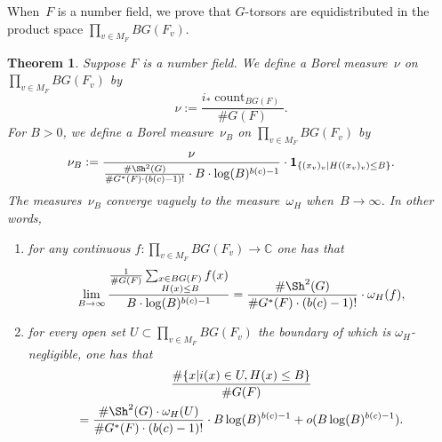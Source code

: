 \documentclass[a4paper,english,12pt]{amsart}
\newcommand{\CC}{\mathbb{C}}
\newcommand{\vMF}{v\in M_F}
\DeclareMathOperator{\coun}{count}
\newtheorem{thm}[equation]{Theorem}
\numberwithin{equation}{subsection}
\begin{document}
When~$F$ is a number field, we prove that $G$-torsors are equidistributed in the product space $\prod_{\vMF}BG(F_v)$.
\begin{thm}%
\label{thmofequidistribution} Suppose $F$ is a number field. We define a Borel measure~$\nu$ on $\prod_{\vMF}BG(F_v)$ by $$\nu:=\frac{i_*\coun_{BG(F)}}{\#G(F)}.$$
 For $B>0$, we define a Borel measure~$\nu_B$ on $\prod_{\vMF}BG(F_v)$ by $$\nu_B:=\frac{\nu}{\frac{\#\Sh^2(G)}{\# G^*(F)\cdot (b(c)-1)!}\cdot B\cdot \log(B)^{b(c)-1}}\cdot\mathbf 1_{\{(x_v)_v|H((x_v)_v)\leq B\}}.$$ The measures~$\nu_B$ converge vaguely to the measure~$\omega_H$ when~$B\to\infty$. In other words,
\begin{enumerate}
\item for any continuous $f:\prod_{\vMF}BG(F_v)\to\CC$ one has that $$\lim_{B\to\infty}\frac{\frac{1}{\# G(F)}\sum_{\substack{x\in BG(F)\\H(x)\leq B}}f(x)}{B\cdot\log(B)^{b(c)-1}}=\frac{\#\Sh^2(G)}{\# G^*(F)\cdot (b(c)-1)!}\cdot \omega_H(f),$$
\item for every open set $U\subset\prod_{\vMF}BG(F_v)$ the boundary of which is $\omega_H$-negligible, one has that \begin{multline*}\frac{\#\{x|i(x)\in U, H(x)\leq B\}}{\# G(F)}\\=\frac{\#\Sh^2(G)\cdot\omega_H(U)}{\# G^*(F)\cdot (b(c)-1)!}\cdot {B\log(B)^{b(c)-1}}+o(B\log(B)^{b(c)-1}).
\end{multline*}
\end{enumerate} 
%
%
\end{thm}
\end{document}
